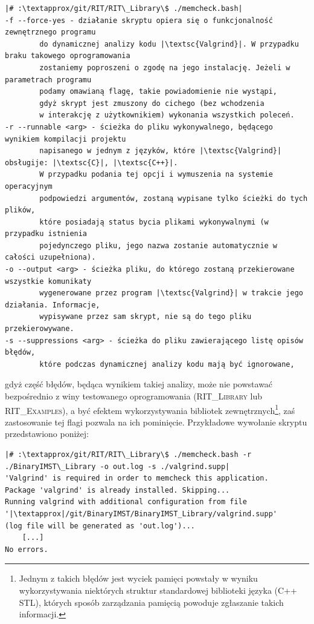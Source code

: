 \begin{verbatim}
|# :\textapprox/git/RIT/RIT\_Library\$ ./memcheck.bash|
-f --force-yes - działanie skryptu opiera się o funkcjonalność zewnętrznego programu 
		do dynamicznej analizy kodu |\textsc{Valgrind}|. W przypadku braku takowego oprogramowania 
		zostaniemy poproszeni o zgodę na jego instalację. Jeżeli w parametrach programu
		podamy omawianą flagę, takie powiadomienie nie wystąpi, 
		gdyż skrypt jest zmuszony do cichego (bez wchodzenia 
		w interakcję z użytkownikiem) wykonania wszystkich poleceń.
-r --runnable <arg> - ścieżka do pliku wykonywalnego, będącego wynikiem kompilacji projektu 
		napisanego w jednym z języków, które |\textsc{Valgrind}| obsługije: |\textsc{C}|, |\textsc{C++}|. 
		W przypadku podania tej opcji i wymuszenia na systemie operacyjnym 
		podpowiedzi argumentów, zostaną wypisane tylko ścieżki do tych plików, 
		które posiadają status bycia plikami wykonywalnymi (w przypadku istnienia 
		pojedynczego pliku, jego nazwa zostanie automatycznie w całości uzupełniona).
-o --output <arg> - ścieżka pliku, do którego zostaną przekierowane wszystkie komunikaty 
		wygenerowane przez program |\textsc{Valgrind}| w trakcie jego działania. Informacje, 
		wypisywane przez sam skrypt, nie są do tego pliku przekierowywane.
-s --suppressions <arg> - ścieżka do pliku zawierającego listę opisów błędów, 
		które podczas dynamicznej analizy kodu mają być ignorowane,
\end{verbatim}
gdyż część błędów, będąca wynikiem takiej analizy, może nie powstawać bezpośrednio z winy testowanego oprogramowania (\textsc{RIT\_Library} lub \textsc{RIT\_Examples}), a być efektem wykorzystywania bibliotek zewnętrznych\footnote{Jednym z takich błędów jest wyciek pamięci powstały w wyniku wykorzystywania niektórych struktur standardowej biblioteki języka (\textsc{C++ STL}), których sposób zarządzania pamięcią powoduje zgłaszanie takich informacji.}, zaś zastosowanie tej flagi pozwala na ich pominięcie. Przykładowe wywołanie skryptu przedstawiono poniżej:

\begin{verbatim}
|# :\textapprox/git/RIT/RIT\_Library\$ ./memcheck.bash -r ./BinaryIMST\_Library -o out.log -s ./valgrind.supp|
'Valgrind' is required in order to memcheck this application.
Package 'valgrind' is already installed. Skipping...
Running valgrind with additional configuration from file 
'|\textapprox|/git/BinaryIMST/BinaryIMST_Library/valgrind.supp' 
(log file will be generated as 'out.log')...
	[...]
No errors.
\end{verbatim}

